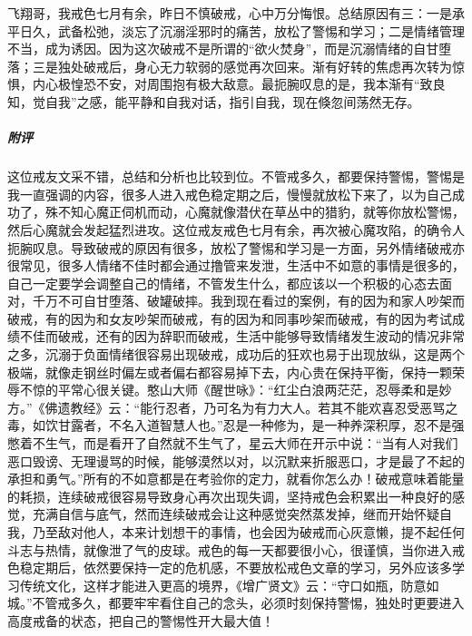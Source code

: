 \begin{case}
    飞翔哥，我戒色七月有余，昨日不慎破戒，心中万分悔恨。总结原因有三：一是承平日久，武备松弛，淡忘了沉溺淫邪时的痛苦，放松了警惕和学习；二是情绪管理不当，成为诱因。因为这次破戒不是所谓的“欲火焚身”，而是沉溺情绪的自甘堕落；三是独处破戒后，身心无力软弱的感觉再次回来。渐有好转的焦虑再次转为惊惧，内心极惶恐不安，对周围抱有极大敌意。最扼腕叹息的是，我本渐有“致良知，觉自我”之感，能平静和自我对话，指引自我，现在倏忽间荡然无存。
    \subparagraph{附评} 这位戒友文采不错，总结和分析也比较到位。不管戒多久，都要保持警惕，警惕是我一直强调的内容，很多人进入戒色稳定期之后，慢慢就放松下来了，以为自己成功了，殊不知心魔正伺机而动，心魔就像潜伏在草丛中的猎豹，就等你放松警惕，然后心魔就会发起猛烈进攻。这位戒友戒色七月有余，再次被心魔攻陷，的确令人扼腕叹息。导致破戒的原因有很多，放松了警惕和学习是一方面，另外情绪破戒亦很常见，很多人情绪不佳时都会通过撸管来发泄，生活中不如意的事情是很多的，自己一定要学会调整自己的情绪，不管发生什么，都应该以一个积极的心态去面对，千万不可自甘堕落、破罐破摔。我到现在看过的案例，有的因为和家人吵架而破戒，有的因为和女友吵架而破戒，有的因为和同事吵架而破戒，有的因为考试成绩不佳而破戒，还有的因为辞职而破戒，生活中能够导致情绪发生波动的情况非常之多，沉溺于负面情绪很容易出现破戒，成功后的狂欢也易于出现放纵，这是两个极端，就像走钢丝时偏左或者偏右都容易掉下去，内心贵在保持平衡，保持一颗荣辱不惊的平常心很关键。憨山大师《醒世咏》：“红尘白浪两茫茫，忍辱柔和是妙方。”《佛遗教经》云：“能行忍者，乃可名为有力大人。若其不能欢喜忍受恶骂之毒，如饮甘露者，不名入道智慧人也。”忍是一种修为，是一种养深积厚，忍不是强憋着不生气，而是看开了自然就不生气了，星云大师在开示中说：“当有人对我们恶口毁谤、无理谩骂的时候，能够漠然以对，以沉默来折服恶口，才是最了不起的承担和勇气。”所有的不如意都是在考验你的定力，就看你怎么办！破戒意味着能量的耗损，连续破戒很容易导致身心再次出现失调，坚持戒色会积累出一种良好的感觉，充满自信与底气，然而连续破戒会让这种感觉突然蒸发掉，继而开始怀疑自我，乃至敌对他人，本来计划想干的事情，也会因为破戒而心灰意懒，提不起任何斗志与热情，就像泄了气的皮球。戒色的每一天都要很小心，很谨慎，当你进入戒色稳定期后，依然要保持一定的危机感，不要放松戒色文章的学习，另外应该多学习传统文化，这样才能进入更高的境界，《增广贤文》云：“守口如瓶，防意如城。”不管戒多久，都要牢牢看住自己的念头，必须时刻保持警惕，独处时更要进入高度戒备的状态，把自己的警惕性开大最大值！
\end{case}

